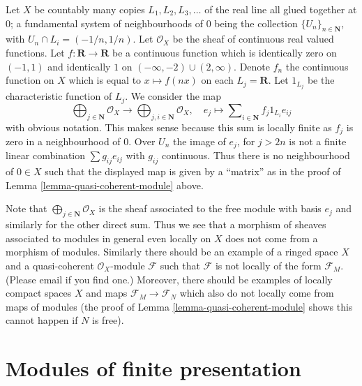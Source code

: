 \begin{example}
\label{example-quasi-coherent}
Let $X$ be countably many copies $L_1, L_2, L_3, \ldots$
of the real line all glued together at $0$; a fundamental
system of neighbourhoods of $0$ being the collection
$\{U_n\}_{n \in \mathbf{N}}$, with $U_n \cap L_i = (-1/n, 1/n)$.
Let $\mathcal{O}_X$ be the sheaf of continuous real valued functions.
Let $f : \mathbf{R} \to \mathbf{R}$ be a continuous function
which is identically zero on $(-1, 1)$ and identically $1$
on $(-\infty, -2) \cup (2, \infty)$. Denote $f_n$ the continuous
function on $X$ which is equal to $x \mapsto f(nx)$ on each
$L_j = \mathbf{R}$. Let $1_{L_j}$ be the characteristic function
of $L_j$. We consider the map
$$
\bigoplus\nolimits_{j \in \mathbf{N}}
\mathcal{O}_X
\longrightarrow
\bigoplus\nolimits_{j, i \in \mathbf{N}}
\mathcal{O}_X, \quad
e_j \longmapsto \sum\nolimits_{i \in \mathbf{N}} f_j 1_{L_i} e_{ij}
$$
with obvious notation. This makes sense because this sum is locally
finite as $f_j$ is zero in a neighbourhood of $0$. Over $U_n$
the image of $e_j$, for $j > 2n$ is not a finite linear combination
$\sum g_{ij} e_{ij}$ with $g_{ij}$ continuous. Thus there is
no neighbourhood of $0 \in X$ such that the displayed map is given by
a ``matrix'' as in the proof of Lemma \ref{lemma-quasi-coherent-module} above.

\medskip\noindent
Note that $\bigoplus\nolimits_{j \in \mathbf{N}} \mathcal{O}_X$
is the sheaf associated to the free module with basis $e_j$
and similarly for the other direct sum. Thus we see that a
morphism of sheaves associated to modules in general even
locally on $X$ does not come from a morphism of modules.
Similarly there should be an example of a ringed space $X$
and a quasi-coherent $\mathcal{O}_X$-module $\mathcal{F}$
such that $\mathcal{F}$ is not locally of the form $\mathcal{F}_M$.
(Please email if you find one.)
Moreover, there should be examples of locally compact spaces
$X$ and maps $\mathcal{F}_M \to \mathcal{F}_N$ which also do
not locally come from maps of modules (the proof of Lemma
\ref{lemma-quasi-coherent-module} shows this cannot happen
if $N$ is free).
\end{example}












\section{Modules of finite presentation}
\label{section-finite-presentation}

